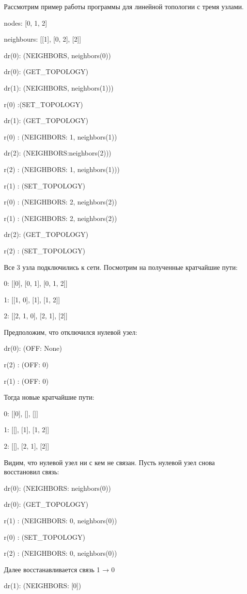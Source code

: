 \documentclass[a4paper,12pt]{article}
\begin{document}
Рассмотрим пример работы программы для линейной топологии с тремя узлами.

nodes: [0, 1, 2]

neighbours: [[1], [0, 2], [2]]


dr(0): (NEIGHBORS, {neighbors(0)})

dr(0): (GET\_TOPOLOGY)

dr(1): (NEIGHBORS, {neighbors(1)}))

r(0) :(SET\_TOPOLOGY)

dr(1): (GET\_TOPOLOGY)

r(0) : (NEIGHBORS: {1, neighbors(1)})

dr(2): (NEIGHBORS:{neighbors(2)}))

r(2) : (NEIGHBORS: {1, neighbors(1)}))

r(1) : (SET\_TOPOLOGY)

r(0) : (NEIGHBORS: {2, neighbors(2)})

r(1) : (NEIGHBORS: {2, neighbors(2)})

dr(2): (GET\_TOPOLOGY)

r(2) : (SET\_TOPOLOGY)


Все 3 узла подключились к сети. Посмотрим на полученные кратчайшие пути:


0: [[0], [0, 1], [0, 1, 2]]

1: [[1, 0], [1], [1, 2]]

2: [[2, 1, 0], [2, 1], [2]]


Предположим, что отключился нулевой узел:

dr(0): (OFF: None)

r(2) : (OFF: 0)

r(1) : (OFF: 0)

Тогда новые кратчайшие пути:

0: [[0], [], []]

1: [[], [1], [1, 2]]

2: [[], [2, 1], [2]]

Видим, что нулевой узел ни с кем не связан. Пусть нулевой узел снова восстановил
связь:

dr(0): (NEIGHBORS: {neighbors(0)})

dr(0): (GET\_TOPOLOGY)

r(1) : (NEIGHBORS: {0, neighbors(0)})

r(0) : (SET\_TOPOLOGY)

r(2) : (NEIGHBORS: {0, neighbors(0)})

Далее восстанавливается связь 1 → 0

dr(1): (NEIGHBORS: [0])
\end{document}
